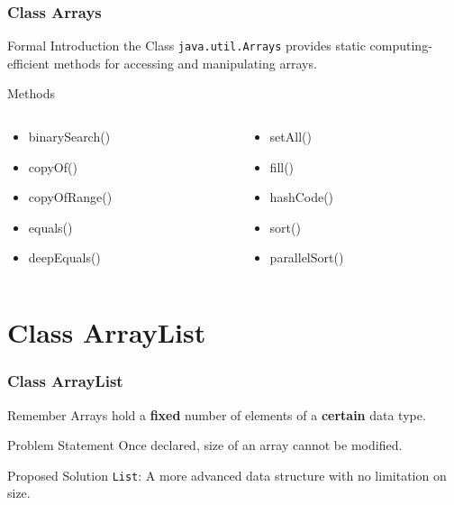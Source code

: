 \documentclass[10pt, compress]{beamer}
\begin{document}
\begin{frame}[fragile]
  \frametitle{Class Arrays}
  \begin{block}{Formal Introduction}
    the Class \texttt{java.util.Arrays} provides static computing-efficient methods for accessing and manipulating arrays.
  \end{block}
  \begin{block}{Methods}
    \begin{columns}
      \begin{column}{0.5\textwidth}
        \begin{itemize}
          \item[] binarySearch()
          \item[] copyOf()
          \item[] copyOfRange()
          \item[] equals()
          \item[] deepEquals()
        \end{itemize}
      \end{column}
      \begin{column}{0.5\textwidth}
        \begin{itemize}
          \item[] setAll()
          \item[] fill()
          \item[] hashCode()
          \item[] sort()
          \item[] parallelSort()
        \end{itemize}
      \end{column}
    \end{columns}
  \end{block}
\end{frame}

\section{Class ArrayList}

\begin{frame}[fragile]
  \frametitle{Class ArrayList}
  \begin{block}{Remember}
    Arrays hold a \textbf{fixed} number of elements of a \textbf{certain} data type.
  \end{block}
  \begin{block}{Problem Statement}
    Once declared, size of an array cannot be modified.
  \end{block}
  \begin{block}{Proposed Solution}
    \texttt{List}: A more advanced data structure with no limitation on size.
  \end{block}
\end{frame}
\end{document}
